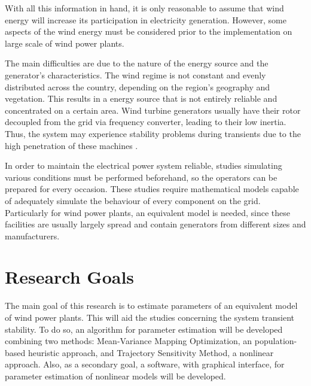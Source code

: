 With all this information in hand, it is only reasonable to assume that wind energy will increase its participation in electricity generation. However, some aspects of the wind energy must be considered prior to the implementation on large scale of wind power plants.

The main difficulties are due to the nature of the energy source and the generator's characteristics. The wind regime is not constant and evenly distributed across the country, depending on the region's geography and vegetation. This results in a energy source that is not entirely reliable and concentrated on a certain area. Wind turbine generators usually have their rotor decoupled from the grid via frequency converter, leading to their low inertia. Thus, the system may experience stability problems during transients due to the high penetration of these machines \cite{Xiong2019}.

In order to maintain the electrical power system reliable, studies simulating various conditions must be performed beforehand, so the operators can be prepared for every occasion. These studies require mathematical models capable of adequately simulate the behaviour of every component on the grid. Particularly for wind power plants, an equivalent model is needed, since these facilities are usually largely spread and contain generators from different sizes and manufacturers. 

\section{Research Goals}

The main goal of this research is to estimate parameters of an equivalent model of wind power plants. This will aid the studies concerning the system transient stability. To do so, an algorithm for parameter estimation will be developed combining two methods: Mean-Variance Mapping Optimization, an population-based heuristic approach, and Trajectory Sensitivity Method, a nonlinear approach. Also, as a secondary goal, a software, with graphical interface, for parameter estimation of nonlinear models will be developed.
